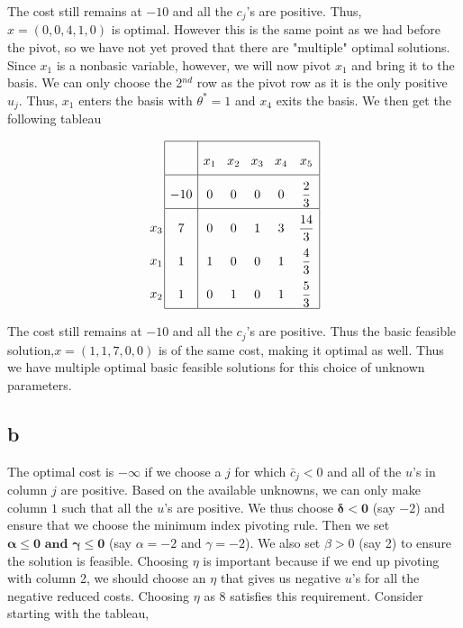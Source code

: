 The cost still remains at $-10$ and all the $c_j$'s are positive. Thus, $x = (0,0,4,1,0)$ is optimal. However this is the same point as we had before the pivot, so we have not yet proved that there are "multiple" optimal solutions. \\

Since $x_1$ is a nonbasic variable, however, we will now pivot $x_1$ and bring it to the basis. We can only choose the 2$^{nd}$ row as the pivot row as it is the only positive $u_j$. Thus, $x_1$ enters the basis with $\theta^* = 1$ and $x_4$ exits the basis. We then get the following tableau

$$
\arraycolsep=1.4pt\def\arraystretch{2.2}
\begin{array}{c}
\\
 \\
x_3 \\
x_1 \\ 
x_2 \\
\end{array}
\arraycolsep=4.4pt\def\arraystretch{2.2}
\begin{array}{|c|ccccc|}
    \hline
    & x_1 & x_2 & x_3 & x_4 & x_5\\ \hline 
 -10 & 0 & 0 & 0 & 0 & \dfrac{2}{3}\\ \hline
  7 & 0 & 0 & 1 & 3 & \dfrac{14}{3}\\
  1 & 1 & 0 & 0 & 1 & \dfrac{4}{3}\\
  1 & 0 & 1 & 0 & 1 & \dfrac{5}{3}\\\hline
\end{array}
$$

The cost still remains at $-10$ and all the $c_j$'s are positive. Thus the basic feasible solution,$x = (1,1,7,0,0)$ is of the same cost, making it optimal as well. Thus we have multiple optimal basic feasible solutions for this choice of unknown parameters.



\subsection*{b}
The optimal cost is $- \infty$ if we choose a $j$ for which $\bar{c}_j < 0$ and all of the $u$'s in column $j$ are positive. Based on the available unknowns, we can only make column $1$ such that all the $u$'s are positive. We thus choose $\boldsymbol{\delta < 0}$ (say $-2$) and ensure that we choose the minimum index pivoting rule. Then we set $\boldsymbol{\alpha \le 0 \text{ and } \gamma \le 0}$ (say $\alpha = -2$ and $\gamma = -2$). We also set $\beta > 0 $ (say 2) to ensure the solution is feasible. Choosing $\eta$ is important because if we end up pivoting with column 2, we should choose an $\eta$ that gives us negative $u$'s for all the negative reduced costs. Choosing $\eta$ as 8 satisfies this requirement. Consider starting with the tableau, 


